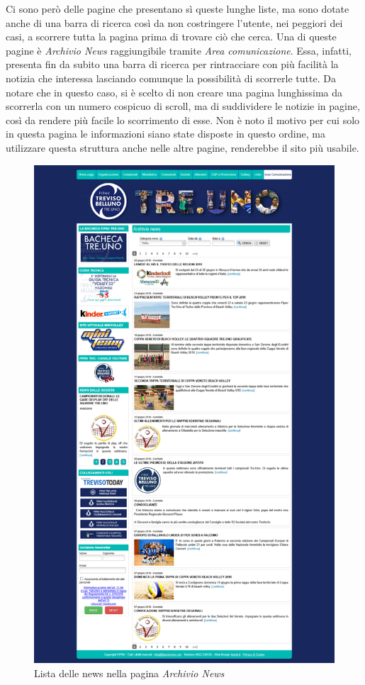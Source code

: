 	Ci sono però delle pagine che presentano sì queste lunghe liste, ma sono dotate 
	anche di una barra di ricerca così da non costringere l'utente, nei peggiori
	dei casi, a scorrere tutta la pagina prima di trovare ciò che cerca.
	Una di queste pagine è \textit{Archivio News} raggiungibile tramite 
	\textit{Area comunicazione}. Essa, infatti, presenta fin da subito una barra di
	ricerca per rintracciare con più facilità la notizia che interessa lasciando 
	comunque la possibilità di scorrerle tutte. Da notare che in questo caso, si è
	scelto di non creare una pagina lunghissima da scorrerla con un numero cospicuo 
	di scroll, ma di suddividere le notizie in pagine, così da rendere più facile 
	lo scorrimento di esse. Non è noto il motivo per cui solo in questa pagina le 
	informazioni siano state disposte in questo ordine, ma utilizzare questa 
	struttura anche nelle altre pagine, renderebbe il sito più usabile.
	
	\begin{figure}[H]
	\centering
	\includegraphics[scale=0.15]{Images/archivio.png}
	\caption{Lista delle news nella pagina \textit{Archivio News}}
	\end{figure}
	
